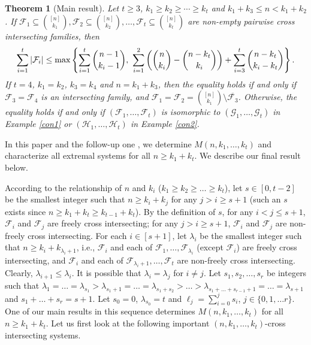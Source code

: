 \documentclass[a4paper,11pt]{article}
\newtheorem{theorem}{Theorem}[section]
\begin{document}
\begin{theorem}[Main result]  \label{main1}
Let $t\geq 3$, $k_1\geq k_2\geq \cdots \geq k_t$ and $k_1+k_3\leq n<k_1+k_2$. If $\mathcal{F}_1\subseteq{[n]\choose k_1}, \mathcal{F}_2\subseteq{[n]\choose k_2}, \dots, \mathcal{F}_t\subseteq{[n]\choose k_t}$ are non-empty pairwise cross intersecting families,  then
$$
\sum_{i=1}^t{|\mathcal{F}_i|}\leq \textup{max} \left\{\sum_{i=1}^t{n-1\choose k_i-1}, \,\,\sum_{i=1}^2\left({n\choose k_i}-{n-k_t\choose k_i}\right)+\sum_{i=3}^t{{n-k_t\choose k_i-k_t}}\right\}.
$$
If $t=4$, $k_1=k_2$, $k_3=k_4$ and $n=k_1+k_3$, then the equality holds if and only if $\mathcal{F}_3=\mathcal{F}_4$ is an intersecting family, and $\mathcal{F}_1=\mathcal{F}_2= {[n]\choose k_1}\setminus \overline{\mathcal{F}_3}$. Otherwise,
the equality holds if and only if $(\mathcal{F}_1, \dots, \mathcal{F}_t)$ is isomorphic to $(\mathcal{G}_1, \dots, \mathcal{G}_t)$ in Example \ref{con1} or $(\mathcal{H}_1, \dots, \mathcal{H}_t)$ in Example \ref{con2}.
\end{theorem}



\iffalse
 In this paper and the follow-up one  \cite{hpgeneral}, we  determine $M(n, k_1, \dots, k_t)$  and characterize all extremal systems for all $n\geq k_1+k_t$.  We describe our final result below.

According to the relationship of $n$ and $k_i$ ($k_1\geq k_2\geq\dots\geq k_t$),
let $s\in [0, t-2]$ be the smallest integer such that $n\geq k_i+k_j$  for any $j>i\geq s+1$ (such an $s$ exists since $n\geq k_1+k_t\ge k_{t-1}+k_t$). By the definition of $s$, for any  $i<j\le s+1$, $\mathcal{F}_i$ and $\mathcal{F}_j$ are freely  cross intersecting; for any $j>i\ge s+1$, $\mathcal{F}_i$ and $\mathcal{F}_j$ are non-freely cross intersecting.
 For each $i\in [s+1]$, let $\lambda_i$ be the smallest integer such that $n\geq k_i+k_{\lambda_i+1}$, i.e.,  $\mathcal{F}_i$ and each of $\mathcal{F}_1, \dots, \mathcal{F}_{\lambda_i}$ (except $\mathcal{F}_i$) are freely cross intersecting,  and $\mathcal{F}_i$ and each of $\mathcal{F}_{\lambda_i+1}, \dots, \mathcal{F}_{t}$ are non-freely cross intersecting.
Clearly, $\lambda_{i+1}\leq \lambda_{i}$. It is possible that $\lambda_i=\lambda_j$ for $i\ne j$. Let $s_1, s_2, \dots, s_r$ be integers such that
$\lambda_1=\dots=\lambda_{s_1}>\lambda_{s_1+1}=\dots=\lambda_{s_1+s_2}>\dots>\lambda_{s_1+\dots+s_{r-1}+1}=\dots=\lambda_{s+1}$ and $s_1+ \dots+s_r=s+1$. Let $s_0=0$, $\lambda_{s_0}=t$ and $\ell_j=\sum_{i=0}^j s_i$, $j\in \{0, 1, \dots r\}$.
One of our main results in this sequence  determines  $M(n, k_1, \dots, k_t)$ for all $n\ge k_1+k_t$. Let us first look at the following  important $(n, k_1, \dots, k_t)$-cross intersecting systems.
\end{document}
